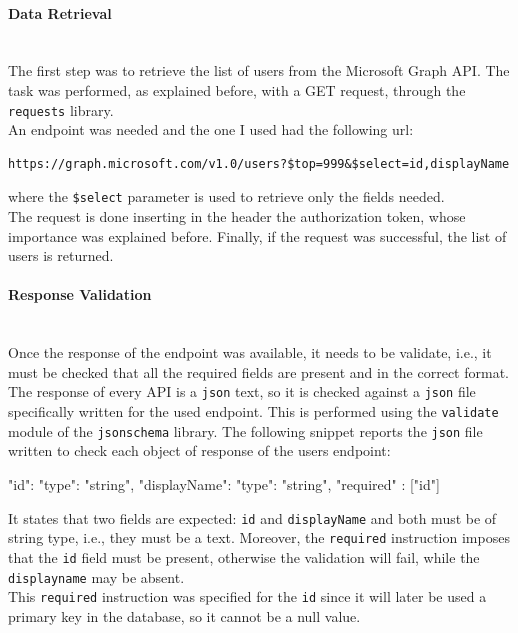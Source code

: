 \documentclass[12pt, a4paper, oneside]{article}
\begin{document}
\paragraph{Data Retrieval} ~\\
The first step was to retrieve the list of users from the Microsoft Graph API. The task was performed, as explained before, with a GET request, through the \texttt{requests} library.\\
An endpoint was needed and the one I used had the following url:  
\begin{Verbatim}[fontsize=\small]
https://graph.microsoft.com/v1.0/users?$top=999&$select=id,displayName
\end{Verbatim}
where the \texttt{\$select} parameter is used to retrieve only the fields needed.\\
The request is done inserting in the header the authorization token, whose importance was explained before. Finally, if the request was successful, the list of users is returned.

\paragraph{Response Validation} ~\\
Once the response of the endpoint was available, it needs to be validate, i.e., it must be checked that all the required fields are present and in the correct format.\\
The response of every API is a \texttt{json} text, so it is checked against a \texttt{json} file specifically written for the used endpoint. This is performed using the \texttt{validate} module of the 
\texttt{jsonschema} library.
The following snippet reports the \texttt{json} file written to check each object of response of the users endpoint:
\begin{python}
    {
    "id": {"type": "string"},
    "displayName": {"type": "string"},
    "required" : ["id"]
    }
\end{python}
It states that two fields are expected: \texttt{id} and \texttt{displayName} and both must be of string type, i.e., they must be a text. Moreover, the \texttt{required} instruction imposes that the \texttt{id} field
must be present, otherwise the validation will fail, while the \texttt{displayname} may be absent.\\
This \texttt{required} instruction was specified for the \texttt{id} since it will later be used a primary key in the database, so it cannot be a null value.
\end{document}
